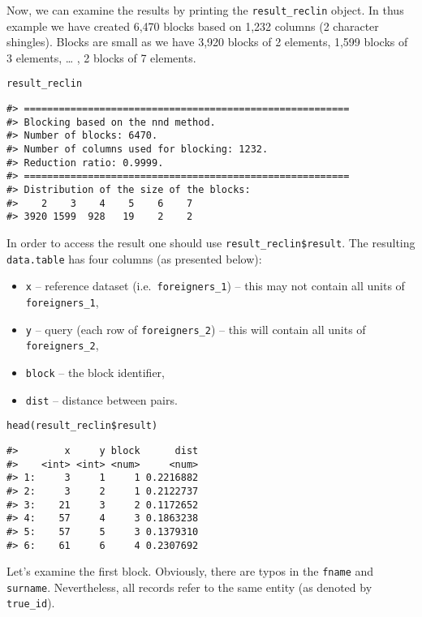 Now, we can examine the results by printing the
\texttt{result\_reclin} object. In thus example we have created
6,470
blocks based on 1,232
columns (2 character shingles). Blocks are small as we have
3,920 blocks of 2
elements, 1,599 blocks of
3 elements, \ldots{} ,
2 blocks of
7 elements.

\begin{verbatim}
result_reclin
\end{verbatim}

\begin{verbatim}
#> ========================================================
#> Blocking based on the nnd method.
#> Number of blocks: 6470.
#> Number of columns used for blocking: 1232.
#> Reduction ratio: 0.9999.
#> ========================================================
#> Distribution of the size of the blocks:
#>    2    3    4    5    6    7
#> 3920 1599  928   19    2    2
\end{verbatim}

In order to access the result one should use \texttt{result\_reclin\$result}. The
resulting \texttt{data.table} has four columns (as presented below):

\begin{itemize}
\tightlist
\item
  \texttt{x} -- reference dataset (i.e.~\texttt{foreigners\_1}) -- this may not
  contain all units of \texttt{foreigners\_1},
\item
  \texttt{y} -- query (each row of \texttt{foreigners\_2}) -- this will contain all
  units of \texttt{foreigners\_2},
\item
  \texttt{block} -- the block identifier,
\item
  \texttt{dist} -- distance between pairs.
\end{itemize}

\begin{verbatim}
head(result_reclin$result)
\end{verbatim}

\begin{verbatim}
#>        x     y block      dist
#>    <int> <int> <num>     <num>
#> 1:     3     1     1 0.2216882
#> 2:     3     2     1 0.2122737
#> 3:    21     3     2 0.1172652
#> 4:    57     4     3 0.1863238
#> 5:    57     5     3 0.1379310
#> 6:    61     6     4 0.2307692
\end{verbatim}

Let's examine the first block. Obviously, there are typos in the \texttt{fname}
and \texttt{surname}. Nevertheless, all records refer to the same entity (as denoted by \texttt{true\_id}).


